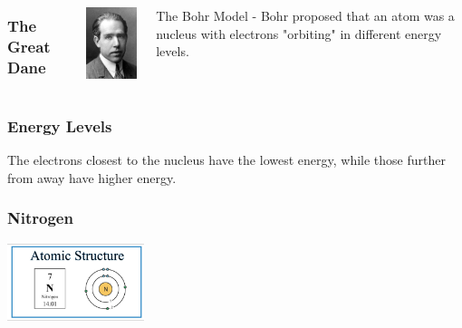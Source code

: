 \documentclass{beamer}
\begin{document}
\begin{frame}
    \begin{columns}
        \frametitle{The Great Dane}
        \begin{column}{0.5\textwidth}
            \includegraphics[width=3cm]{../../images/Bohr.jpg}
        \end{column}
        \begin{column}{0.5\textwidth}
            The Bohr Model - Bohr proposed that an atom was a nucleus with electrons "orbiting" in different 
            \pause \alert{energy levels}.
            \vspace{1cm}
        
        \end{column}
    \end{columns}
\end{frame}

\begin{frame}
    \frametitle{Energy Levels}
    \onslide The electrons closest to the nucleus have the 
    \pause \alert{lowest} 
    \onslide energy, while those further from away have 
    \pause\alert{higher} 
    \onslide energy.
\end{frame}

\begin{frame}
    \frametitle{Nitrogen}
    \includegraphics[width=4cm]{../../images/bohr_atom_N.jpg}
\end{frame}
\end{document}
